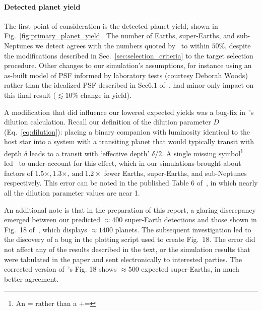\paragraph{Detected planet yield}
The first point of consideration is the detected planet yield, shown in Fig.~\ref{fig:primary_planet_yield}.
The number of Earths, super-Earths, and sub-Neptunes we detect agrees with the numbers quoted by~ to within $50\%$, despite the modifications described in Sec.~\ref{sec:selection_criteria} to the target selection procedure.
Other changes to our simulation's assumptions, for instance using an as-built model of \tesss PSF informed by laboratory tests (courtesy Deborah Woods) rather than the idealized PSF described in Sec6.1 of~, had minor only impact on this final result ($\lesssim 10\%$ change in yield).

A modification that did influence our lowered expected yields was a bug-fix 
in~'s dilution calculation. Recall our definition of 
the dilution parameter $D$ (Eq.~\ref{eq:dilution}): placing a binary companion 
with luminosity identical to the host star into a system with a transiting 
planet that would typically transit with depth $\delta$ leads to a transit with 
`effective depth' $\delta/2$. A single missing symbol\footnote{An $\texttt{=}$ rather than 
a $\texttt{+=}$} led~ to under-account for this 
effect, which 
in our simulations brought about factors of $1.5\times, 1.3\times,\ 
\mathrm{and}\ 1.2\times$ fewer Earths, super-Earths, and sub-Neptunes 
respectively. This error can be noted in the published Table 6 
of~, in which nearly all the dilution parameter 
values are near 1.

An additional note is that in the preparation of this report, a glaring 
discrepancy emerged between our predicted $\approx 400$ super-Earth detections 
and those shown in Fig.~18 of~\citetalias{Sullivan_2015}, which 
displays $\approx 1400$ planets. The subsequent investigation led to the discovery 
of a bug in the plotting script used to create Fig.~18. The error did not
affect any of the results described in the text, or the simulation results that were tabulated in the paper and sent electronically to interested parties.
The corrected version 
of~'s Fig. 18 shows $\approx 500$ expected 
super-Earths, in much better agreement.


